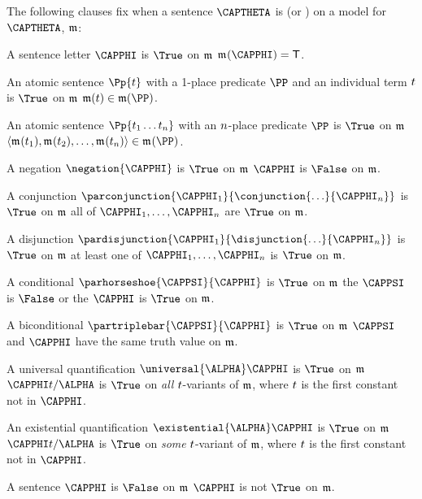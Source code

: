 \begin{majorILnc}{}
The following clauses fix when a \GQL{} sentence $\CAPTHETA$ is \nidf{$\True$} (or \nidf{$\False$}) on a model for $\CAPTHETA$, $\mathfrak{m}$:
\begin{cenumerate}
	\item A sentence letter $\CAPPHI$ is $\True$ on $\mathfrak{m}$ \Iff $\As{}{}(\CAPPHI)=\TrueB$.
	\item An atomic sentence $\Pp{\variable{t}}$ with a 1-place predicate $\PP$ and an individual term $t$ is $\True$ on $\mathfrak{m}$ \Iff $\IntA(\variable{t})\in\IntA(\PP)$.
	\item\label{formtruthatomicn} An atomic sentence $\Pp{\variable{t}_1\ldots\variable{t}_{\integer{n}}}$ with an $n$-place predicate $\PP$ is $\True$ on $\mathfrak{m}$ \Iff $\langle \As{}{}(\variable{t}_1),\As{}{}(\variable{t}_2),\ldots,\As{}{}(\variable{t}_{\integer{n}}) \rangle \in \As{}{}(\PP)$. 
	\item A negation $\negation{\CAPPHI}$ is $\True$ on $\mathfrak{m}$ \Iff $\CAPPHI$ is $\False$ on $\mathfrak{m}$.
	\item A conjunction $\parconjunction{\CAPPHI_1}{\conjunction{\ldots}{\CAPPHI_{\integer{n}}}}$ is $\True$ on $\mathfrak{m}$ \Iff all of $\CAPPHI_1,\ldots,\CAPPHI_{\integer{n}}$ are $\True$ on $\mathfrak{m}$.
	\item A disjunction $\pardisjunction{\CAPPHI_1}{\disjunction{\ldots}{\CAPPHI_{\integer{n}}}}$ is $\True$ on $\mathfrak{m}$ \Iff at least one of $\CAPPHI_1,\ldots,\CAPPHI_{\integer{n}}$ is $\True$ on $\mathfrak{m}$.
	\item A conditional $\parhorseshoe{\CAPPSI}{\CAPPHI}$ is $\True$ on $\mathfrak{m}$ \Iff the  $\CAPPSI$ is $\False$ or the  $\CAPPHI$ is $\True$ on $\mathfrak{m}$.
	\item A biconditional $\partriplebar{\CAPPSI}{\CAPPHI}$ is $\True$ on $\mathfrak{m}$ \Iff $\CAPPSI$ and $\CAPPHI$ have the same truth value on $\mathfrak{m}$.
	\item\label{GQLTruthUnvQuant} A universal quantification $\universal{\ALPHA}\CAPPHI$ is $\True$ on $\mathfrak{m}$ \Iff $\CAPPHI\variable{t}/\ALPHA$ is $\True$ on \emph{all} $t$-variants of $\mathfrak{m}$, where $t$ is the first constant not in $\CAPPHI$.
	\item An existential quantification $\existential{\ALPHA}\CAPPHI$ is $\True$ on $\mathfrak{m}$ \Iff $\CAPPHI\variable{t}/\ALPHA$ is $\True$ on \emph{some} $t$-variant of $\mathfrak{m}$, where $t$ is the first constant not in $\CAPPHI$.
	\item A sentence $\CAPPHI$ is $\False$ on $\mathfrak{m}$ \Iff $\CAPPHI$ is not $\True$ on $\mathfrak{m}$.
\end{cenumerate}
\end{majorILnc}

